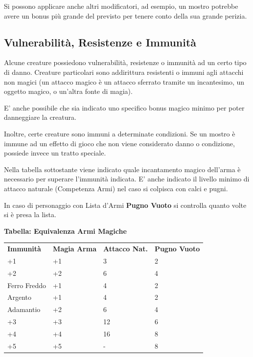 \begin{multicols}{2}
Si possono applicare anche altri modificatori, ad esempio, un mostro potrebbe avere un bonus più grande del previsto per tenere conto della sua grande perizia.


\subsection{Vulnerabilità, Resistenze e Immunità}
Alcune creature possiedono vulnerabilità, resistenze o immunità ad un certo tipo di danno. Creature particolari sono addirittura resistenti o immuni agli attacchi non magici (un attacco magico è un attacco sferrato tramite un incantesimo, un oggetto magico, o un'altra fonte di magia).

E' anche possibile che sia indicato uno specifico bonus magico minimo per poter danneggiare la creatura.

Inoltre, certe creature sono immuni a determinate condizioni. Se un mostro è immune ad un effetto di gioco che non viene considerato danno o condizione, possiede invece un tratto speciale.

Nella tabella sottostante viene indicato quale incantamento magico dell'arma è necessario per superare l'immunità indicata. E' anche indicato il livello minimo di attacco naturale  (Competenza Armi) nel caso si colpisca con calci e pugni.

In caso di personaggio con Lista d'Armi \textbf{Pugno Vuoto} si controlla quanto volte si è presa la lista.

\medskip

\textbf{Tabella: Equivalenza Armi Magiche}\hypertarget{equivalenzemagiche}{}\label{equivalenzaarmimagiche}

\medskip

\begin{tabular}{lp{}p{}p{}}
\toprule
\textbf{Immunità} & \textbf{Magia Arma} & \textbf{Attacco Nat.}& \textbf{Pugno Vuoto}\\
+1         & +1     &  3&  2\\
+2         & +2     &  6&  4\\
Ferro Freddo & +1     &  4&  2\\
Argento  & +1     &  4&  2\\
Adamantio       & +2     &  6&  4\\
+3      & +3     &  12& 6\\
+4         & +4     &  16& 8\\
+5         & +5     & - &  8\\
\end{tabular}


\end{multicols}
